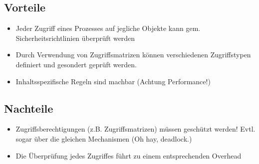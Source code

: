 \subsection*{Vorteile}
\begin{itemize}
	\item Jeder Zugriff eines Prozesses auf jegliche Objekte kann gem. Sicherheitsrichtlinien überprüft werden
	\item Durch Verwendung von Zugriffsmatrizen können verschiedenen Zugriffstypen definiert und gesondert geprüft werden.
	\item Inhaltsspezifische Regeln sind machbar (Achtung Performance!)
\end{itemize}

\subsection*{Nachteile}
\begin{itemize}
	\item Zugriffsberechtigungen (z.B. Zugriffsmatrizen) müssen geschützt werden! Evtl. sogar über die gleichen Mechanismen (Oh hay, deadlock.)
	\item Die Überprüfung jedes Zugriffes führt zu einem entsprechenden Overhead
\end{itemize}